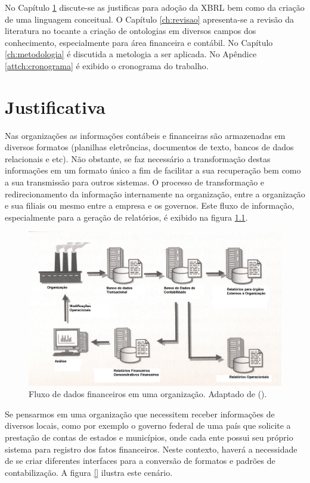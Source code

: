 \documentclass[msc,proposal]{ppgccufmg} %
\begin{document}
No Capítulo \ref{ch:justificativa} discute-se as justificas para adoção da XBRL bem como da criação de uma linguagem conceitual. O Capítulo \ref{ch:revisao} apresenta-se a revisão da literatura no tocante a criação de ontologias em diversos campos dos conhecimento, especialmente para área financeira e contábil. No Capítulo \ref{ch:metodologia} é discutida a metologia a ser aplicada. No Apêndice \ref{attch:cronograma} é exibido o cronograma do trabalho.

\chapter{Justificativa}
\label{ch:justificativa}

Nas organizações as informações contábeis e financeiras são armazenadas em diversos formatos (planilhas eletrôncias, documentos de texto, bancos de dados relacionais e etc). Não obstante, se faz necessário a transformação destas informações em um formato único a fim de facilitar a sua recuperação bem como a sua transmissão para outros sistemas. O processo de transformação e redirecionamento da informação internamente na organização, entre a organização e sua filiais ou mesmo entre a empresa e os governos. Este fluxo de informação, especialmente para a geração de relatórios, é exibido na figura \ref{fig:fluxo_dados}.

\begin{figure}[hbtp]
\centering
\includegraphics[width=.75\textwidth]{img/fluxo_informacoes.png}
\caption{Fluxo de dados financeiros em uma organização. Adaptado de (\cite{bergeron2004essentials}).}
\label{fig:fluxo_dados}
\end{figure}

Se pensarmos em uma organização que necessitem receber informações de diversos locais, como por exemplo o governo federal de uma país que solicite a prestação de contas de estados e municípios, onde cada ente possui seu próprio sistema para registro dos fatos financeiros. Neste contexto, haverá a necessidade de se criar diferentes interfaces para a conversão de formatos e padrões de contabilização. A figura \ref{} ilustra este cenário.
\end{document}
